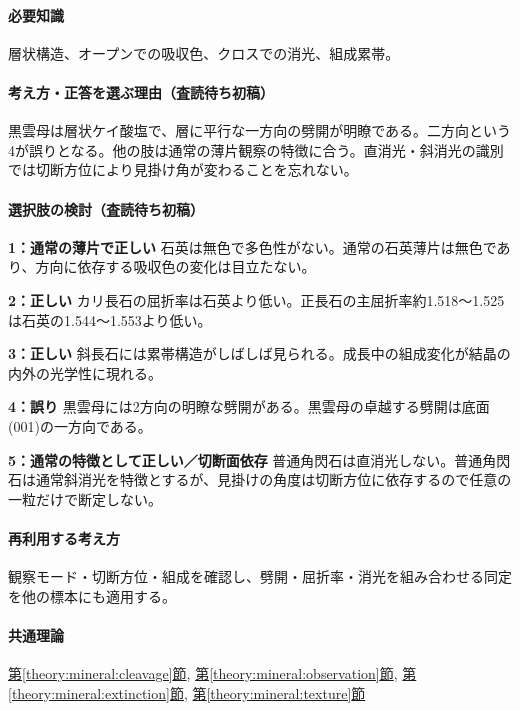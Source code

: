 \paragraph{必要知識} 層状構造、オープンでの吸収色、クロスでの消光、組成累帯。

\paragraph{考え方・正答を選ぶ理由（査読待ち初稿）} 黒雲母は層状ケイ酸塩で、層に平行な一方向の劈開が明瞭である。二方向という4が誤りとなる。他の肢は通常の薄片観察の特徴に合う。直消光・斜消光の識別では切断方位により見掛け角が変わることを忘れない。

\paragraph{選択肢の検討（査読待ち初稿）}\mbox{}\par

\noindent\textbf{1：通常の薄片で正しい} 石英は無色で多色性がない。通常の石英薄片は無色であり、方向に依存する吸収色の変化は目立たない。\par

\noindent\textbf{2：正しい} カリ長石の屈折率は石英より低い。正長石の主屈折率約1.518〜1.525は石英の1.544〜1.553より低い。\par

\noindent\textbf{3：正しい} 斜長石には累帯構造がしばしば見られる。成長中の組成変化が結晶の内外の光学性に現れる。\par

\noindent\textbf{4：誤り} 黒雲母には2方向の明瞭な劈開がある。黒雲母の卓越する劈開は底面(001)の一方向である。\par

\noindent\textbf{5：通常の特徴として正しい／切断面依存} 普通角閃石は直消光しない。普通角閃石は通常斜消光を特徴とするが、見掛けの角度は切断方位に依存するので任意の一粒だけで断定しない。\par

\paragraph{再利用する考え方} 観察モード・切断方位・組成を確認し、劈開・屈折率・消光を組み合わせる同定を他の標本にも適用する。

\paragraph{共通理論} \hyperref[theory:mineral:cleavage]{第\ref*{theory:mineral:cleavage}節}, \hyperref[theory:mineral:observation]{第\ref*{theory:mineral:observation}節}, \hyperref[theory:mineral:extinction]{第\ref*{theory:mineral:extinction}節}, \hyperref[theory:mineral:texture]{第\ref*{theory:mineral:texture}節}

